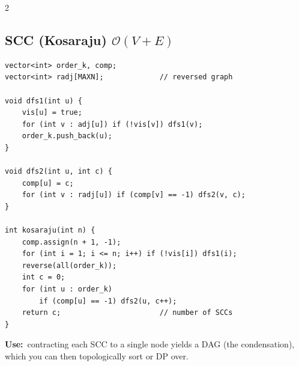\documentclass[10pt]{article}
\newcommand{\sub}[2]{\subsection[#1]{#1\hspace{0.6em}%
  \textnormal{\color{accent2}\small$\mathcal{O}(#2)$}}}
\newcommand{\uses}[1]{{\color{accent2}\footnotesize\textbf{Use:}}~{\footnotesize #1}\par}
\begin{document}
\begin{multicols}{2}
\sub{SCC (Kosaraju)}{V + E}
\begin{lstlisting}
vector<int> order_k, comp;
vector<int> radj[MAXN];             // reversed graph

void dfs1(int u) {
    vis[u] = true;
    for (int v : adj[u]) if (!vis[v]) dfs1(v);
    order_k.push_back(u);
}

void dfs2(int u, int c) {
    comp[u] = c;
    for (int v : radj[u]) if (comp[v] == -1) dfs2(v, c);
}

int kosaraju(int n) {
    comp.assign(n + 1, -1);
    for (int i = 1; i <= n; i++) if (!vis[i]) dfs1(i);
    reverse(all(order_k));
    int c = 0;
    for (int u : order_k)
        if (comp[u] == -1) dfs2(u, c++);
    return c;                       // number of SCCs
}
\end{lstlisting}
\uses{contracting each SCC to a single node yields a DAG (the condensation),
which you can then topologically sort or DP over.}

\end{multicols}

\end{document}

